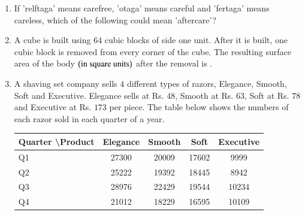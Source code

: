 \documentclass[journal,12pt,onecolumn]{IEEEtran}
\theoremstyle{remark}
\begin{document}
\begin{enumerate}
		\item If 'relftaga' means carefree, 'otaga' means careful and 'fertaga' means careless, which of the following could mean 'aftercare'?
		
		\hfill{}
		\begin{enumerate}
		\end{enumerate}
		
		\item A cube is built using $64$ cubic blocks of side one unit. After it is built, one cubic block is removed from every corner of the cube. The resulting surface area of the body $\left(\text{in square units}\right)$ after the removal is \underline{\hspace{2cm}}.
		
		\hfill{\brak{\text{GATE CS 2016}}}
		\begin{enumerate}
			\begin{multicols}{4}
				\item $56$
				\item $64$
				\item $72$
				\item $96$
			\end{multicols}
		\end{enumerate}
		
		\item A shaving set company sells $4$ different types of razors, Elegance, Smooth, Soft and Executive. Elegance sells at Rs. $48$, Smooth at Rs. $63$, Soft at Rs. $78$ and Executive at Rs. $173$ per piece. The table below shows the numbers of each razor sold in each quarter of a year.
		
		\begin{table}[h]
			\centering
			\begin{tabular}{|l|c|c|c|c|}
				\hline
				Quarter \textbackslash Product & Elegance & Smooth & Soft & Executive \\
				\hline
				Q1 & 27300 & 20009 & 17602 & 9999 \\
								\hline
				Q2 & 25222 & 19392 & 18445 & 8942 \\
								\hline
				Q3 & 28976 & 22429 & 19544 & 10234 \\
								\hline
				Q4 & 21012 & 18229 & 16595 & 10109 \\
				

\end{tabular}
\end{table}
\end{enumerate}
\end{document}
